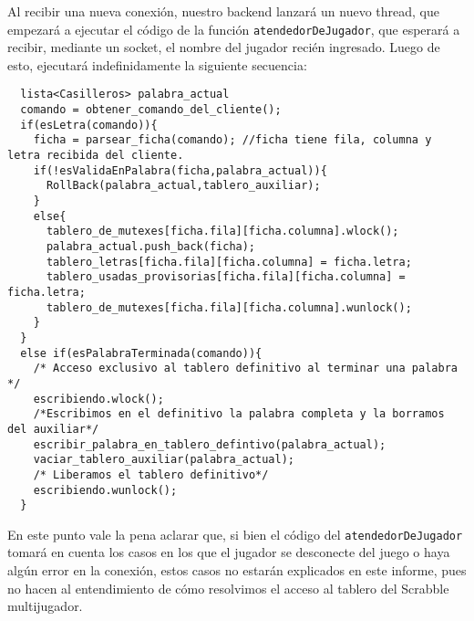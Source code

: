Al recibir una nueva conexi\'on, nuestro backend lanzar\'a un nuevo thread, que empezar\'a a ejecutar el c\'odigo de la funci\'on \verb|atendedorDeJugador|, 
que esperar\'a a recibir, mediante un socket, el nombre del jugador reci\'en ingresado. Luego de esto, ejecutar\'a indefinidamente la siguiente secuencia:

\begin{verbatim}
  lista<Casilleros> palabra_actual
  comando = obtener_comando_del_cliente();
  if(esLetra(comando)){
    ficha = parsear_ficha(comando);	//ficha tiene fila, columna y letra recibida del cliente.
    if(!esValidaEnPalabra(ficha,palabra_actual)){
      RollBack(palabra_actual,tablero_auxiliar);
    }
    else{
      tablero_de_mutexes[ficha.fila][ficha.columna].wlock();
      palabra_actual.push_back(ficha);
      tablero_letras[ficha.fila][ficha.columna] = ficha.letra;
      tablero_usadas_provisorias[ficha.fila][ficha.columna] = ficha.letra;
      tablero_de_mutexes[ficha.fila][ficha.columna].wunlock();
    }
  }
  else if(esPalabraTerminada(comando)){
    /* Acceso exclusivo al tablero definitivo al terminar una palabra */
    escribiendo.wlock();
    /*Escribimos en el definitivo la palabra completa y la borramos del auxiliar*/
    escribir_palabra_en_tablero_defintivo(palabra_actual);
    vaciar_tablero_auxiliar(palabra_actual);
    /* Liberamos el tablero definitivo*/
    escribiendo.wunlock(); 
  }
\end{verbatim}

En este punto vale la pena aclarar que, si bien el c\'odigo del \verb|atendedorDeJugador| tomar\'a en cuenta los casos en los que el jugador se desconecte
del juego o haya alg\'un error en la conexi\'on, estos casos no estar\'an explicados en este informe, pues no hacen al entendimiento de c\'omo resolvimos
el acceso al tablero del Scrabble multijugador.
